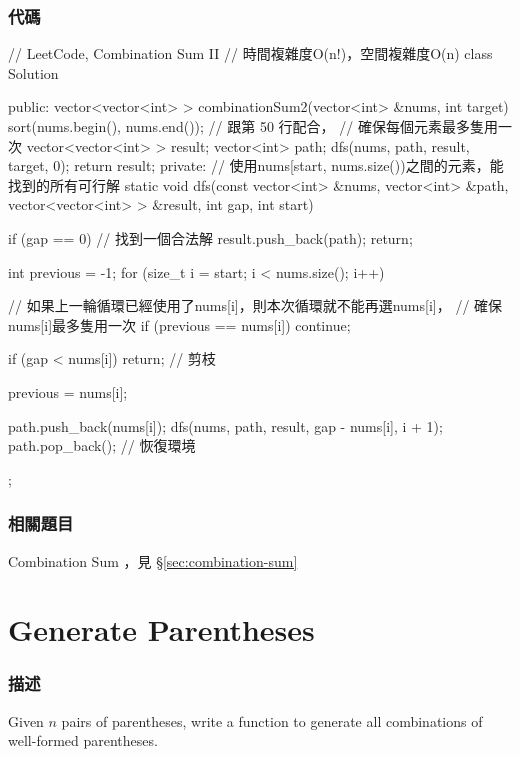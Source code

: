 \subsubsection{代碼}
\begin{Code}
// LeetCode, Combination Sum II
// 時間複雜度O(n!)，空間複雜度O(n)
class Solution {
public:
    vector<vector<int> > combinationSum2(vector<int> &nums, int target) {
        sort(nums.begin(), nums.end()); // 跟第 50 行配合，
                                        // 確保每個元素最多隻用一次
        vector<vector<int> > result;
        vector<int> path;
        dfs(nums, path, result, target, 0);
        return result;
    }
private:
    // 使用nums[start, nums.size())之間的元素，能找到的所有可行解
    static void dfs(const vector<int> &nums, vector<int> &path, 
            vector<vector<int> > &result, int gap, int start) {
        if (gap == 0) {  //  找到一個合法解
            result.push_back(path);
            return;
        }

        int previous = -1;
        for (size_t i = start; i < nums.size(); i++) {
            // 如果上一輪循環已經使用了nums[i]，則本次循環就不能再選nums[i]，
            // 確保nums[i]最多隻用一次
            if (previous == nums[i]) continue;

            if (gap < nums[i]) return;  // 剪枝

            previous = nums[i];

            path.push_back(nums[i]);
            dfs(nums, path, result, gap - nums[i], i + 1);
            path.pop_back();  // 恢復環境
        }
    }
};
\end{Code}


\subsubsection{相關題目}
\begindot
\item Combination Sum ，見 \S \ref{sec:combination-sum}
\myenddot


\section{Generate Parentheses } %
\label{sec:generate-parentheses}


\subsubsection{描述}
Given $n$ pairs of parentheses, write a function to generate all combinations of well-formed parentheses.

